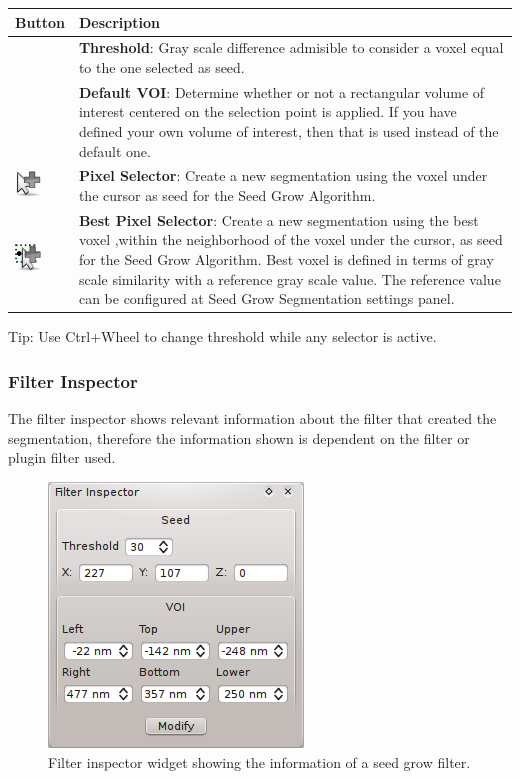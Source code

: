 \begin{tabular}{| m{1.3cm} | m{13.5cm} |}
\hline
\textbf{Button} & \textbf{Description}\\
\hline
& %
\textbf{Threshold}: Gray scale difference admisible to consider a voxel equal to
the one selected as seed. \\
\hline
& %
\textbf{Default VOI}: Determine whether or not a rectangular volume of interest
centered on the selection point is applied. If you have defined your own volume
of interest, then that is used instead of the default one.\\
\hline
\includegraphics[width=0.7cm]{../../frontend/toolbar/seedgrow/rsc/pixelSelector} &
\textbf{Pixel Selector}: Create a new segmentation using the voxel under the
cursor as seed for the Seed Grow Algorithm.\\
\hline
\includegraphics[width=0.7cm]{../../frontend/toolbar/seedgrow/rsc/bestPixelSelector} &
\textbf{Best Pixel Selector}: Create a new segmentation using the best voxel
,within the neighborhood of the voxel under the cursor, as seed for the Seed
Grow Algorithm. Best voxel is defined in terms of gray scale similarity with a
reference gray scale value. The reference value can be configured at Seed Grow
Segmentation settings panel.\\
\hline
\end{tabular}

Tip: Use Ctrl+Wheel to change threshold while any selector is active.

\subsubsection{Filter Inspector}
The filter inspector shows relevant information about the filter that created the segmentation,
therefore the information shown is dependent on the filter or plugin filter used.

\begin{figure}[H]
\centering
\includegraphics{fig/SeedGrowSegmentationFilterInspector}
\caption{Filter inspector widget showing the information of a seed grow filter.}
\end{figure}

